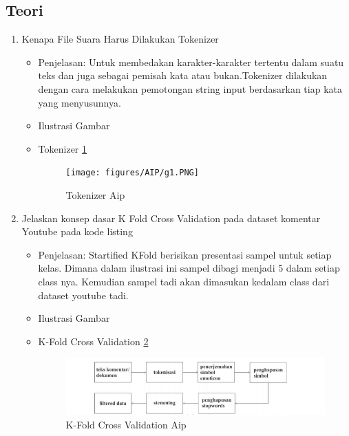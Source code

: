 \subsection{Teori}
\begin{enumerate}
\item Kenapa File Suara Harus Dilakukan Tokenizer
\begin{itemize}
\item Penjelasan: Untuk membedakan karakter-karakter tertentu dalam suatu teks dan juga sebagai pemisah kata atau bukan.Tokenizer dilakukan dengan cara melakukan pemotongan string input berdasarkan tiap kata yang menyusunnya.
\par 
\par
\item Ilustrasi Gambar
\item Tokenizer \ref{teori1}
\begin{figure}[!hbtp]
\centering
\texttt{[image: figures/AIP/g1.PNG]}
\caption{Tokenizer Aip}
\label{teori1}
\end{figure}
\par
\end{itemize}
\par
\par

\item Jelaskan konsep dasar K Fold Cross Validation pada dataset komentar Youtube pada kode listing 

\begin{itemize}
\item Penjelasan: Startified KFold berisikan presentasi sampel untuk setiap kelas. Dimana dalam ilustrasi ini sampel dibagi menjadi 5 dalam setiap class nya. Kemudian sampel tadi akan dimasukan kedalam class dari dataset youtube tadi.
\par 
\par
\item Ilustrasi Gambar
\item K-Fold Cross Validation \ref{teori2}
\begin{figure}[!hbtp]
\centering
\includegraphics[scale=0.7]{figures/AIP/g2.PNG}
\caption{K-Fold Cross Validation Aip}
\label{teori2}
\end{figure}
\par
\end{itemize}
\par
\par


\end{enumerate}
